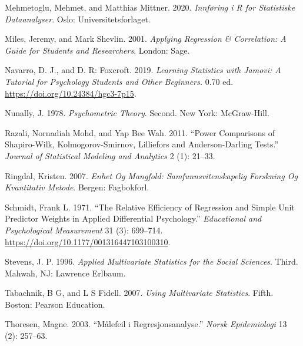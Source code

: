 \documentclass[
]{article}
\newlength{\cslhangindent}
\newlength{\cslentryspacingunit} %
\newenvironment{CSLReferences}[2] %
 {%
  \setlength{\parindent}{0pt}
  \ifodd #1
  \let\oldpar\par
  \def\par{\hangindent=\cslhangindent\oldpar}
  \fi
  \setlength{\parskip}{#2\cslentryspacingunit}
 }%
 {}
\begin{document}
\begin{CSLReferences}{1}{0}
\leavevmode{}%
Mehmetoglu, Mehmet, and Matthias Mittner. 2020. \emph{Innføring i {R}
for Statistiske Dataanalyser}. {Oslo}: {Universitetsforlaget}.

\leavevmode{}%
Miles, Jeremy, and Mark Shevlin. 2001. \emph{Applying {Regression} \&
{Correlation}: {A Guide} for {Students} and {Researchers}}. {London}:
{Sage}.

\leavevmode{}%
Navarro, D. J., and D. R: Foxcroft. 2019. \emph{Learning Statistics with
Jamovi: A Tutorial for Psychology Students and Other Beginners.} 0.70
ed. \url{https://doi.org/10.24384/hgc3-7p15}.

\leavevmode{}%
Nunally, J. 1978. \emph{Psychometric {Theory}}. Second. {New York}:
{McGraw-Hill}.

\leavevmode{}%
Razali, Nornadiah Mohd, and Yap Bee Wah. 2011. {``Power Comparisons of
{Shapiro-Wilk}, {Kolmogorov-Smirnov}, {Lilliefors} and
{Anderson-Darling} Tests.''} \emph{Journal of Statistical Modeling and
Analytics} 2 (1): 21--33.

\leavevmode{}%
Ringdal, Kristen. 2007. \emph{Enhet Og Mangfold: Samfunnsvitenskapelig
Forskning Og Kvantitativ Metode}. {Bergen}: {Fagbokforl.}

\leavevmode{}%
Schmidt, Frank L. 1971. {``The {Relative Efficiency} of {Regression} and
{Simple Unit Predictor Weights} in {Applied Differential Psychology}.''}
\emph{Educational and Psychological Measurement} 31 (3): 699--714.
\url{https://doi.org/10.1177/001316447103100310}.

\leavevmode{}%
Stevens, J. P. 1996. \emph{Applied Multivariate Statistics for the
Social Sciences}. Third. {Mahwah, NJ}: {Lawrence Erlbaum}.

\leavevmode{}%
Tabachnik, B G, and L S Fidell. 2007. \emph{Using Multivariate
Statistics}. Fifth. {Boston}: {Pearson Education}.

\leavevmode{}%
Thoresen, Magne. 2003. {``Målefeil i Regresjonsanalyse.''} \emph{Norsk
Epidemiologi} 13 (2): 257--63.


\end{CSLReferences}
\end{document}
